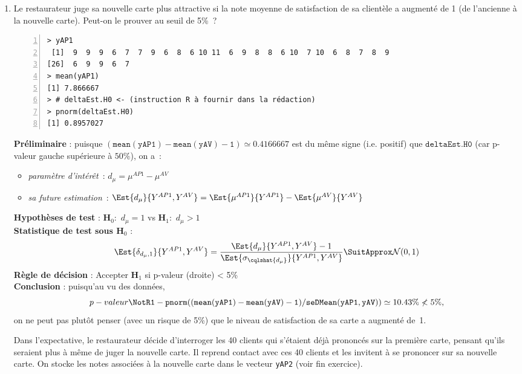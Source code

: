 \documentclass[10pt]{report}
\begin{document}
\begin{exercice}
\begin{enumerate}
\item Le restaurateur juge sa nouvelle carte plus attractive si la note moyenne de satisfaction de sa client{\`e}le a augment{\'e} de 1 (de l'ancienne {\`a} la nouvelle carte). Peut-on le prouver au seuil de 5\%~?

\IndicR
\begin{Verbatim}[frame=leftline,fontfamily=tt,fontshape=n,numbers=left]
> yAP1
 [1]  9  9  9  6  7  7  9  6  8  6 10 11  6  9  8  8  6 10  7 10  6  8  7  8  9
[26]  6  9  9  6  7
> mean(yAP1)
[1] 7.866667
> # deltaEst.H0 <- (instruction R à fournir dans la rédaction)
> pnorm(deltaEst.H0)
[1] 0.8957027
\end{Verbatim}

 

\begin{Correction}
\noindent \textbf{Préliminaire} : puisque $\mathtt{(mean(yAP1)-mean(yAV)-1)}\simeq0.4166667$ est du même signe (i.e. positif) que $\mathtt{deltaEst.H0}$ (car p-valeur gauche supérieure à $50\%$), on a~: 
      \begin{itemize}
\item \textit{paramètre d'intérêt}~: $d_\mu=\mu^{AP1}-\mu^{AV}$
\item \textit{sa future estimation}~: $\Est{d_\mu}{Y^{AP1},Y^{AV}}=\Est{\mu^{AP1}}{Y^{AP1}}-\Est{\mu^{AV}}{Y^{AV}}$
\end{itemize}
\noindent \textbf{Hypothèses de test} : $\mathbf{H}_0:$ $d_\mu=1$ vs {\large $\mathbf{H}_1:$ $d_\mu>1$}\\
\textbf{Statistique de test sous $\mathbf{H}_0$} :
  $$
  \Est{\delta_{d_\mu,1}}{Y^{AP1},Y^{AV}}= {\displaystyle \frac{\Est{d_\mu}{Y^{AP1},Y^{AV}}-1}{
\Est{\sigma_{\cqlshat{d_\mu}}}{Y^{AP1},Y^{AV}}
}} 
  \SuitApprox \mathcal{N}(0,1)
  $$
\textbf{Règle de décision} : Accepter $\mathbf{H}_1$ si 
  p-valeur (droite) < 5\%\\
\noindent \textbf{Conclusion} :
puisqu'au vu des données, 
  \[
p-valeur\NotR\mathtt{1-pnorm((mean(yAP1)-mean(yAV)-1)/seDMean(yAP1,yAV))} \simeq 10.43\%\nless5\%,
\]
on ne peut pas plutôt penser (avec un risque de 5\%) que le niveau de satisfaction de sa carte a augmenté de~1.
\end{Correction}


Dans l'expectative, le restaurateur d{\'e}cide d'interroger les 40 clients qui s'{\'e}taient d{\'e}j{\`a} prononc{\'e}s sur la premi{\`e}re carte, pensant qu'ils seraient plus {\`a} m{\^e}me de juger la nouvelle carte. Il reprend contact avec ces 40 clients et les invitent {\`a} se prononcer sur sa nouvelle carte. On stocke les notes associ{\'e}es {\`a} la nouvelle carte dans le vecteur \texttt{yAP2} (voir fin exercice). 


\end{enumerate}
\end{exercice}
\end{document}
